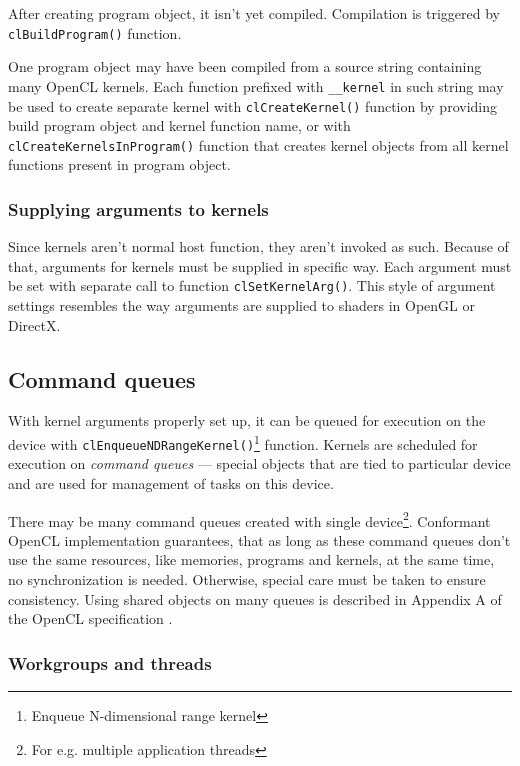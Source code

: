 After creating program object, it isn't yet compiled. Compilation is triggered
by \texttt{cl\-Build\-Program()} function.

One program object may have been compiled from a source string containing many
OpenCL kernels. Each function prefixed with \texttt{\_\_kernel} in such string
may be used to create separate kernel with \texttt{clCreate\-Kernel()} function by
providing build program object and kernel function name, or with
\texttt{clCreateKernelsInProgram()} function that creates kernel objects from
all kernel functions present in program object.

\subsubsection{Supplying arguments to kernels}

Since kernels aren't normal host function, they aren't invoked as such. Because
of that, arguments for kernels must be supplied in specific way. Each argument
must be set with separate call to function \texttt{clSetKernelArg()}. This style
of argument settings resembles the way arguments are supplied to shaders in OpenGL
or DirectX.

\subsection{Command queues}

With kernel arguments properly set up, it can be queued for execution on the
device with \texttt{clEnqueueNDRangeKernel()}\footnote{Enqueue N-dimensional range kernel}
function. Kernels are scheduled for execution on \emph{command queues} --- special
objects that are tied to particular device and are used for management of tasks
on this device.

There may be many command queues created with single
device\footnote{For e.g. multiple application threads}. Conformant OpenCL
implementation guarantees, that as long as these command queues don't use the
same resources, like memories, programs and kernels, at the same time, no
synchronization is needed. Otherwise, special care must be taken to ensure
consistency. Using shared objects on many queues is described in Appendix A
of the OpenCL specification \parencite{openclspec}.

\subsubsection{Workgroups and threads}
\label{subsub:clworkgroups}

